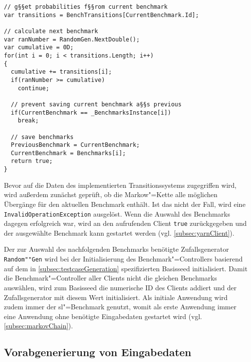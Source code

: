 \begin{lstlisting}[label=lst:benchmarkChanging,style=cs,
caption={[Auswahl des nachfolgenden Benchmarks]
    Auswahl des nachfolgenden Benchmarks (gekürzt).
    Dies stellt einen Ausschnitt der Methode \texttt{ChangeBenchmark()} dar, welche vom Client zur Bestimmung des nachfolgenden Benchmarks aufgerufen wird (vgl. \cref{subsec:yarnClient}).}]
// g§§et probabilities f§§rom current benchmark
var transitions = BenchTransitions[CurrentBenchmark.Id];

// calculate next benchmark
var ranNumber = RandomGen.NextDouble();
var cumulative = 0D;
for(int i = 0; i < transitions.Length; i++)
{
  cumulative += transitions[i];
  if(ranNumber >= cumulative)
    continue;
  
  // prevent saving current benchmark a§§s previous
  if(CurrentBenchmark == _BenchmarksInstance[i])
    break;
  
  // save benchmarks
  PreviousBenchmark = CurrentBenchmark;
  CurrentBenchmark = Benchmarks[i];
  return true;
}
\end{lstlisting}

Bevor auf die Daten des implementierten Transitionssystems zugegriffen wird, wird außerdem zunächst geprüft, ob die Markow"=Kette alle möglichen Übergänge für den aktuellen Benchmark enthält.
Ist das nicht der Fall, wird eine \texttt{InvalidOperationException} ausgelöst.
Wenn die Auswahl des Benchmarks dagegen erfolgreich war, wird an den aufrufenden Client \texttt{true} zurückgegeben und der ausgewählte Benchmark kann gestartet werden (vgl. \cref{subsec:yarnClient}).

Der zur Auswahl des nachfolgenden Benchmarks benötigte Zufallsgenerator \texttt{Random""Gen} wird bei der Initialisierung des Benchmark"=Controllers basierend auf dem in \cref{subsec:testcaseGeneration} spezifizierten Basisseed initialisiert.
Damit die Benchmark"=Controller aller Clients nicht die gleichen Benchmarks auswählen, wird zum Basisseed die numerische ID des Clients addiert und der Zufallsgenerator mit diesem Wert initialisiert.
Als initiale Anwendung wird zudem immer der \acl{sl}"=Benchmark genutzt, womit als erste Anwendung immer eine Anwendung ohne benötigte Eingabedaten gestartet wird (vgl. \cref{subsec:markovChain}).

\subsection{Vorabgenerierung von Eingabedaten}
\label{subsec:precreateInputData}
